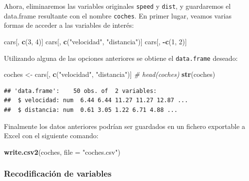 \documentclass[]{book}
\newenvironment{Shaded}{\begin{snugshade}}{\end{snugshade}}
\newcommand{\KeywordTok}[1]{\textcolor[rgb]{0.13,0.29,0.53}{\textbf{#1}}}
\newcommand{\DataTypeTok}[1]{\textcolor[rgb]{0.13,0.29,0.53}{#1}}
\newcommand{\DecValTok}[1]{\textcolor[rgb]{0.00,0.00,0.81}{#1}}
\newcommand{\StringTok}[1]{\textcolor[rgb]{0.31,0.60,0.02}{#1}}
\newcommand{\CommentTok}[1]{\textcolor[rgb]{0.56,0.35,0.01}{\textit{#1}}}
\newcommand{\OperatorTok}[1]{\textcolor[rgb]{0.81,0.36,0.00}{\textbf{#1}}}
\newcommand{\NormalTok}[1]{#1}
\begin{document}
Ahora, eliminaremos las variables originales \texttt{speed} y
\texttt{dist}, y guardaremos el data.frame resultante con el nombre
\texttt{coches}. En primer lugar, veamos varias formas de acceder a las
variables de interés:

\begin{Shaded}
\begin{Highlighting}[]
\NormalTok{cars[, }\KeywordTok{c}\NormalTok{(}\DecValTok{3}\NormalTok{, }\DecValTok{4}\NormalTok{)]}
\NormalTok{cars[, }\KeywordTok{c}\NormalTok{(}\StringTok{"velocidad"}\NormalTok{, }\StringTok{"distancia"}\NormalTok{)]}
\NormalTok{cars[, }\OperatorTok{-}\KeywordTok{c}\NormalTok{(}\DecValTok{1}\NormalTok{, }\DecValTok{2}\NormalTok{)]}
\end{Highlighting}
\end{Shaded}

Utilizando alguna de las opciones anteriores se obtiene el
\texttt{data.frame} deseado:

\begin{Shaded}
\begin{Highlighting}[]
\NormalTok{coches <-}\StringTok{ }\NormalTok{cars[, }\KeywordTok{c}\NormalTok{(}\StringTok{"velocidad"}\NormalTok{, }\StringTok{"distancia"}\NormalTok{)]}
\CommentTok{# head(coches)}
\KeywordTok{str}\NormalTok{(coches)}
\end{Highlighting}
\end{Shaded}

\begin{verbatim}
## 'data.frame':    50 obs. of  2 variables:
##  $ velocidad: num  6.44 6.44 11.27 11.27 12.87 ...
##  $ distancia: num  0.61 3.05 1.22 6.71 4.88 ...
\end{verbatim}

Finalmente los datos anteriores podrían ser guardados en un fichero
exportable a Excel con el siguiente comando:

\begin{Shaded}
\begin{Highlighting}[]
\KeywordTok{write.csv2}\NormalTok{(coches, }\DataTypeTok{file =} \StringTok{"coches.csv"}\NormalTok{)}
\end{Highlighting}
\end{Shaded}

\subsubsection{Recodificación de
variables}\label{recodificaciuxf3n-de-variables}
\end{document}
